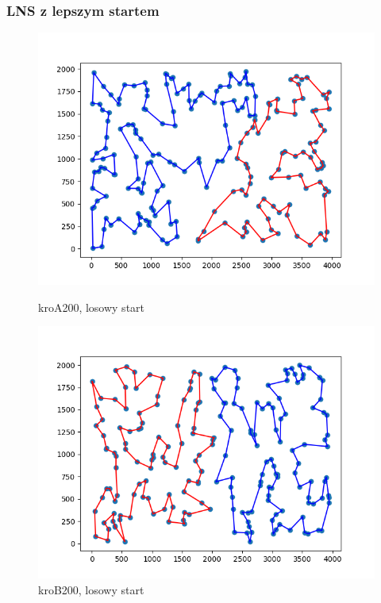 \documentclass[11pt]{article}
\begin{document}
\subsubsection{LNS z lepszym startem}

\begin{figure}[H]
    \begin{minipage}[t]{0.45\textwidth}
        \centering
        \includegraphics[width=\linewidth]{best_paths_swojstarter/kroA200/LNS}
        \caption{kroA200, losowy start}
    \end{minipage}
    \hfill
    \begin{minipage}[t]{0.45\textwidth}
        \centering
        \includegraphics[width=\linewidth]{best_paths_swojstarter/kroB200/LNS}
        \caption{kroB200, losowy start}
    \end{minipage}\label{fig:figure99}
\end{figure}
\end{document}
